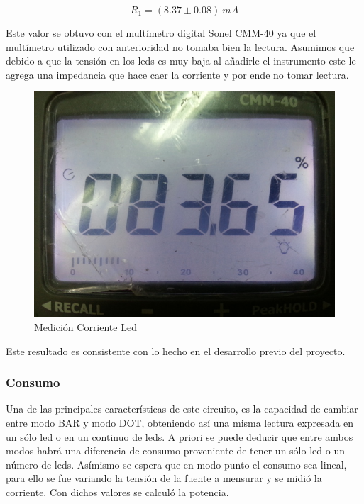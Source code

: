 \documentclass[12pt,a4paper]{article}
\begin{document}
			\begin{equation}
				R_1 = (8.37 \pm 0.08) \: mA
			\end{equation}

			Este valor se obtuvo con el multímetro digital Sonel CMM-40 ya que el multímetro utilizado con anterioridad no tomaba bien la lectura. Asumimos que debido a que la tensión en los leds es muy baja al añadirle el instrumento este le agrega una impedancia que hace caer la corriente y por ende no tomar lectura.

			\begin{figure}[H]
			\centering
				\includegraphics[scale=0.5]{images/sonel.jpg}\caption{Medición Corriente Led}
			\end{figure}

			Este resultado es consistente con lo hecho en el desarrollo previo del proyecto.

			\subsubsection{Consumo}
				Una de las principales características de este circuito, es la capacidad de cambiar entre modo BAR y modo DOT, obteniendo así una misma lectura expresada en un sólo led o en un continuo de leds. A priori se puede deducir que entre ambos modos habrá una diferencia de consumo proveniente de tener un sólo led o un número de leds. Asímismo se espera que en modo punto el consumo sea lineal, para ello se fue variando la tensión de la fuente a mensurar y se midió la corriente. Con dichos valores se calculó la potencia.
\end{document}
